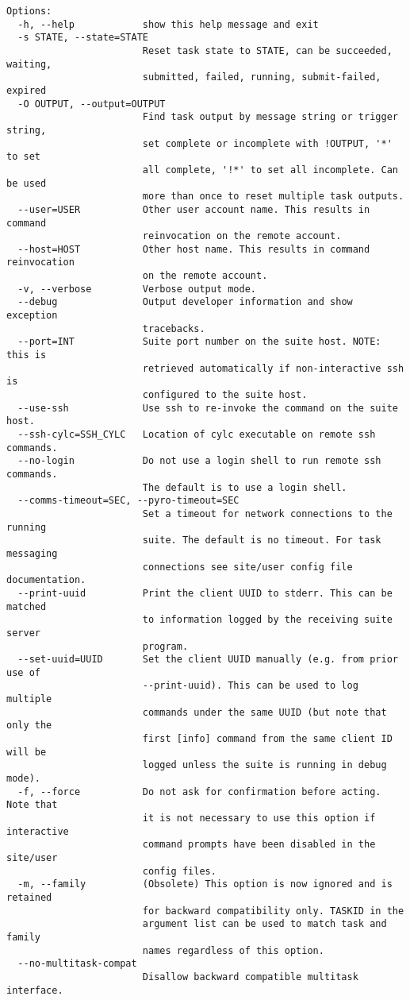 \begin{lstlisting}
Options:
  -h, --help            show this help message and exit
  -s STATE, --state=STATE
                        Reset task state to STATE, can be succeeded, waiting,
                        submitted, failed, running, submit-failed, expired
  -O OUTPUT, --output=OUTPUT
                        Find task output by message string or trigger string,
                        set complete or incomplete with !OUTPUT, '*' to set
                        all complete, '!*' to set all incomplete. Can be used
                        more than once to reset multiple task outputs.
  --user=USER           Other user account name. This results in command
                        reinvocation on the remote account.
  --host=HOST           Other host name. This results in command reinvocation
                        on the remote account.
  -v, --verbose         Verbose output mode.
  --debug               Output developer information and show exception
                        tracebacks.
  --port=INT            Suite port number on the suite host. NOTE: this is
                        retrieved automatically if non-interactive ssh is
                        configured to the suite host.
  --use-ssh             Use ssh to re-invoke the command on the suite host.
  --ssh-cylc=SSH_CYLC   Location of cylc executable on remote ssh commands.
  --no-login            Do not use a login shell to run remote ssh commands.
                        The default is to use a login shell.
  --comms-timeout=SEC, --pyro-timeout=SEC
                        Set a timeout for network connections to the running
                        suite. The default is no timeout. For task messaging
                        connections see site/user config file documentation.
  --print-uuid          Print the client UUID to stderr. This can be matched
                        to information logged by the receiving suite server
                        program.
  --set-uuid=UUID       Set the client UUID manually (e.g. from prior use of
                        --print-uuid). This can be used to log multiple
                        commands under the same UUID (but note that only the
                        first [info] command from the same client ID will be
                        logged unless the suite is running in debug mode).
  -f, --force           Do not ask for confirmation before acting. Note that
                        it is not necessary to use this option if interactive
                        command prompts have been disabled in the site/user
                        config files.
  -m, --family          (Obsolete) This option is now ignored and is retained
                        for backward compatibility only. TASKID in the
                        argument list can be used to match task and family
                        names regardless of this option.
  --no-multitask-compat
                        Disallow backward compatible multitask interface.
\end{lstlisting}
